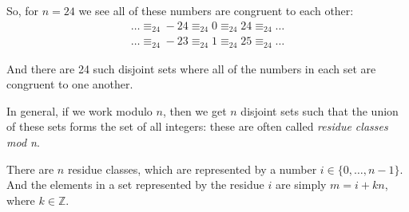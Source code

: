 \documentclass[openany]{book}
\begin{document}
So, for $n=24$ we see all of these numbers are congruent to each other:
\begin{align*}
	\ldots\equiv_{24}-24\equiv_{24}0\equiv_{24}24\equiv_{24}\ldots \\
	\ldots\equiv_{24}-23\equiv_{24}1\equiv_{24}25\equiv_{24}\ldots
\end{align*}

And there are 24 such disjoint sets where all of the numbers in each set are congruent to one another. 

In general, if we work modulo $n$, then we get $n$ disjoint sets such that the union of these sets forms the set of all integers: these are often called \textit{residue classes mod n}.

There are $n$ residue classes, which are represented by a number $i\in\{0,\ldots,n-1\}$. And the elements in a set represented by the residue $i$ are simply $m=i+kn$, where $k\in\mathbb{Z}$.
\end{document}
